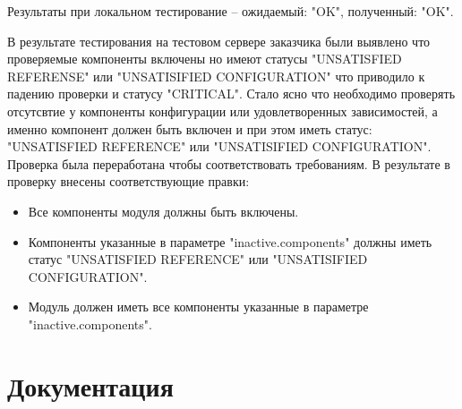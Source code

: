 Результаты при локальном тестирование – ожидаемый: "OK", полученный: "OK".

В результате тестирования на тестовом сервере заказчика были выявлено что проверяемые компоненты включены но имеют статусы "UNSATISFIED REFERENSE" или "UNSATISIFIED CONFIGURATION" что приводило к падению проверки и статусу "CRITICAL". Стало ясно что необходимо проверять отсутсвтие у компоненты конфигурации или удовлетворенных зависимостей, а именно компонент должен быть включен и при этом иметь статус: "UNSATISFIED REFERENCE" или "UNSATISIFIED CONFIGURATION". Проверка была переработана чтобы соответствовать требованиям. В результате в проверку внесены соответствующие правки: 
\begin{itemize}
\item Все компоненты модуля должны быть включены.
\item Компоненты указанные в параметре "inactive.components" должны иметь статус "UNSATISFIED
REFERENCE" или "UNSATISIFIED CONFIGURATION".
\item Модуль должен иметь все компоненты указанные в параметре "inactive.components".
\end{itemize}

%
%

\section{Документация}

